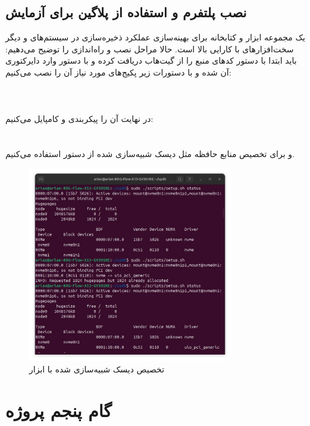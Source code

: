 \documentclass[12pt]{article}
\begin{document}
{\subsection*{نصب پلتفرم  و استفاده از پلاگین  برای آزمایش}
 یک مجموعه ابزار و کتابخانه برای بهینه‌سازی عملکرد ذخیره‌سازی در سیستم‌های  و دیگر سخت‌افزارهای با کارایی بالا است. حالا مراحل نصب و راه‌اندازی  را توضیح می‌دهیم:
باید ابتدا با دستور  کدهای منبع را از گیت‌هاب دریافت کرده و با دستور  وارد دایرکتوری آن شده و با دستورات زیر پکیج‌های مورد نیاز آن را نصب می‌کنیم:\\
\\
\\
\\
در نهایت آن را پیکربندی و کامپایل می‌کنیم:\\
\\
\\
و برای تخصیص منابع حافظه مثل دیسک شبیه‌سازی شده از دستور  استفاده می‌کنیم.


\begin{figure}[h]
    \centering
    \includegraphics[width=0.8\textwidth]{9.png}
    \caption{تخصیص دیسک شبیه‌سازی شده با ابزار }
\end{figure}

\newpage
\section*{گام پنجم پروژه}
}
\end{document}
